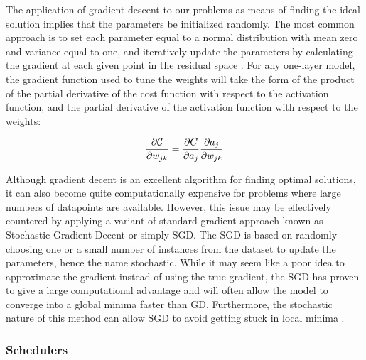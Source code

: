\documentclass[onecolumn,10pt,cleanfoot]{asme2ej}
\begin{document}
The application of gradient descent to our problems as means of finding the ideal solution implies that the parameters be initialized randomly. The most common approach is to set each parameter equal to a normal distribution with mean zero and variance equal to one, and iteratively update the parameters by calculating the gradient at each given point in the residual space \cite[preface p. x]{dds}. For any one-layer model, the gradient function used to tune the weights will take the form of the product of the partial derivative of the cost function with respect to the activation function, and the partial derivative of the activation function with respect to the weights: 

\begin{equation}
\frac{\partial{\cal C}}{\partial w_{jk}}  = \frac{\partial C}{\partial a_{j}}\frac{\partial a_j}{\partial w_{jk}}
\end{equation}

Although gradient decent is an excellent algorithm for finding optimal solutions, it can also become quite computationally expensive for problems where large numbers of datapoints are available. However, this issue may be effectively countered by applying a variant of standard gradient approach known as Stochastic Gradient Decent or simply SGD. The SGD is based on randomly choosing one or a small number of instances from the dataset to update the parameters, hence the name stochastic. While it may seem like a poor idea to approximate the gradient instead of using the true gradient, the SGD has proven to give a large computational advantage and will often allow the model to converge into a global minima faster than GD. Furthermore, the stochastic nature of this method can allow SGD to avoid getting stuck in local minima \cite[46]{sr}.

\subsubsection{Schedulers}
\end{document}
